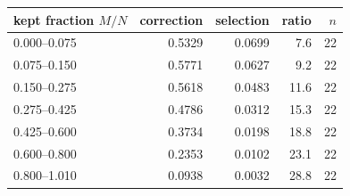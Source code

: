 \begin{tabular}{lrrrr}
\toprule
kept fraction $M/N$ & correction & selection & ratio & $n$\\
\midrule
0.000--0.075 & 0.5329 & 0.0699 & 7.6 & 22\\
0.075--0.150 & 0.5771 & 0.0627 & 9.2 & 22\\
0.150--0.275 & 0.5618 & 0.0483 & 11.6 & 22\\
0.275--0.425 & 0.4786 & 0.0312 & 15.3 & 22\\
0.425--0.600 & 0.3734 & 0.0198 & 18.8 & 22\\
0.600--0.800 & 0.2353 & 0.0102 & 23.1 & 22\\
0.800--1.010 & 0.0938 & 0.0032 & 28.8 & 22\\
\bottomrule
\end{tabular}
